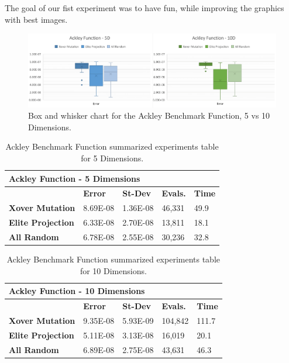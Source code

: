 \documentclass[graybox]{svmult}
\begin{document}
            The goal of our fist experiment was to have fun, while improving the graphics with best images.

            \begin{figure}
                \includegraphics[width=\linewidth, frame]{img/fig_fun_ackley.pdf}
                \caption{Box and whisker chart for the Ackley Benchmark Function, 5 vs 10 Dimensions.} \label{fig.fun_ackley}
                \end{figure}

            \begin{table}[]
                \scriptsize
                \centering
                \caption{Ackley Benchmark Function summarized experiments table for 5 Dimensions.}\label{tab.fun_ackley5}
                \begin{tabular}{@{}lllll@{}}
                \toprule
                \multicolumn{5}{l}{\textbf{Ackley Function - 5 Dimensions}} \\ \midrule
                & \textbf{Error} & \textbf{St-Dev} & \textbf{Evals.} & \textbf{Time} \\
                \textbf{Xover Mutation} & 8.69E-08 & 1.36E-08 & 46,331 & 49.9 \\
                \textbf{Elite Projection} & 6.33E-08 & 2.70E-08 & 13,811 & 18.1 \\
                \textbf{All Random} & 6.78E-08 & 2.55E-08 & 30,236 & 32.8 \\ \bottomrule
                \end{tabular}
                \end{table}

            \begin{table}[]
                \scriptsize
                \centering
                \caption{Ackley Benchmark Function summarized experiments table for 10 Dimensions.}\label{tab.fun_ackley10}
                \begin{tabular}{@{}lllll@{}}
                \toprule
                \multicolumn{5}{l}{\textbf{Ackley Function - 10 Dimensions}} \\ \midrule
                & \textbf{Error} & \textbf{St-Dev} & \textbf{Evals.} & \textbf{Time} \\
                \textbf{Xover Mutation} & 9.35E-08 & 5.93E-09 & 104,842 & 111.7 \\
                \textbf{Elite Projection} & 5.11E-08 & 3.13E-08 & 16,019 & 20.1 \\
                \textbf{All Random} & 6.89E-08 & 2.75E-08 & 43,631 & 46.3 \\ \bottomrule
                \end{tabular}
                \end{table}
\end{document}
